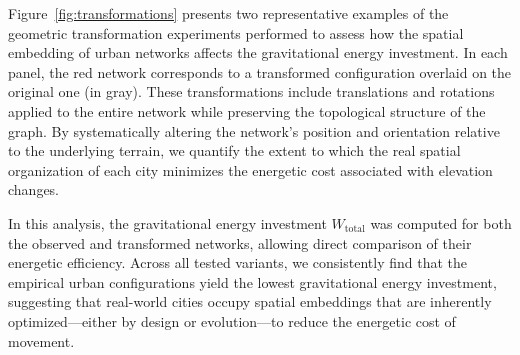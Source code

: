 \documentclass[twocolumn,amsmath,amssymb,floatfix,nature,shownopacs,footinbib,superscriptaddress]{revtex4-1} %
\begin{document}

\medskip
Figure~\ref{fig:transformations} presents two representative examples of the geometric transformation experiments performed to assess how the spatial embedding of urban networks affects the gravitational energy investment. 
In each panel, the red network corresponds to a transformed configuration overlaid on the original one (in gray). 
These transformations include translations and rotations applied to the entire network while preserving the topological structure of the graph. 
By systematically altering the network's position and orientation relative to the underlying terrain, we quantify the extent to which the real spatial organization of each city minimizes the energetic cost associated with elevation changes.

In this analysis, the gravitational energy investment $W_{\text{total}}$ was computed for both the observed and transformed networks, allowing direct comparison of their energetic efficiency. 
Across all tested variants, we consistently find that the empirical urban configurations yield the lowest gravitational energy investment, suggesting that real-world cities occupy spatial embeddings that are inherently optimized—either by design or evolution—to reduce the energetic cost of movement.
\end{document}
